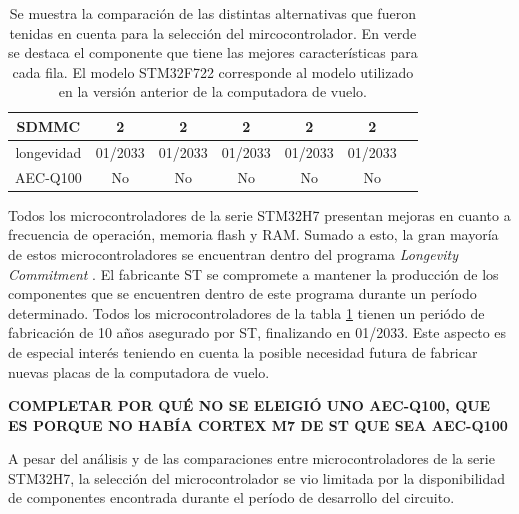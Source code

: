 \begin{table}[H]
\begin{tabular}{|c||c|c|c|c|c|c|}
        \hline
        SDMMC & \cellcolor{green!25}2 & \cellcolor{green!25}2 & \cellcolor{green!25}2 & \cellcolor{green!25}2 & \cellcolor{green!25}2\\
        \hline
        longevidad & \cellcolor{green!25}01/2033 & \cellcolor{green!25}01/2033 & \cellcolor{green!25}01/2033 & \cellcolor{green!25}01/2033 & \cellcolor{green!25}01/2033\\
        \hline
        AEC-Q100 & No & No & No & No & No\\
        \hline       
    \end{tabular}
    \caption{Se muestra la comparación de las distintas alternativas que fueron tenidas en cuenta para la selección del mircocontrolador. En verde se destaca el componente que tiene las mejores características para cada fila. El modelo STM32F722 corresponde al modelo utilizado en la versión anterior de la computadora de vuelo.}
    \label{tab:comparacion_MCUs}
\end{table}

Todos los microcontroladores de la serie STM32H7 presentan mejoras en cuanto a frecuencia de operación, memoria flash y RAM. Sumado a esto, la gran mayoría de estos microcontroladores se encuentran dentro del programa \textit{Longevity Commitment} \cite{longevity_ST}. El fabricante ST se compromete a mantener la producción de los componentes que se encuentren dentro de este programa durante un período determinado. Todos los microcontroladores de la tabla \ref{tab:comparacion_MCUs} tienen un periódo de fabricación de 10 años asegurado por ST, finalizando en 01/2033. Este aspecto es de especial interés teniendo en cuenta la posible necesidad futura de fabricar nuevas placas de la computadora de vuelo.

\textbf{{\color{red} COMPLETAR POR QUÉ NO SE ELEIGIÓ UNO AEC-Q100, QUE ES PORQUE NO HABÍA CORTEX M7 DE ST QUE SEA AEC-Q100}}



A pesar del análisis y de las comparaciones entre microcontroladores de la serie STM32H7, la selección del microcontrolador se vio limitada por la disponibilidad de componentes encontrada durante el período de desarrollo del circuito.

